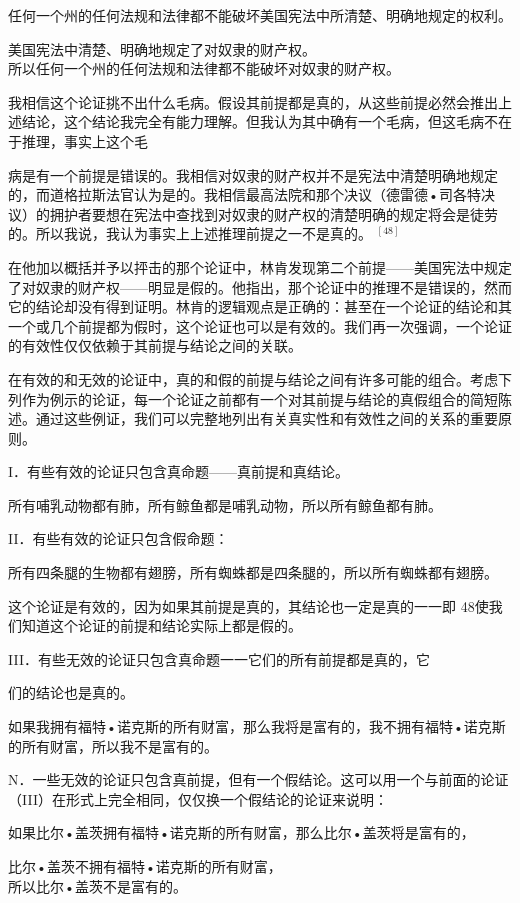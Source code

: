 任何一个州的任何法规和法律都不能破坏美国宪法中所清楚、明确地规定的权利。

美国宪法中清楚、明确地规定了对奴隶的财产权。\\
所以任何一个州的任何法规和法律都不能破坏对奴隶的财产权。

我相信这个论证挑不出什么毛病。假设其前提都是真的，从这些前提必然会推出上述结论，这个结论我完全有能力理解。但我认为其中确有一个毛病，但这毛病不在于推理，事实上这个毛

病是有一个前提是错误的。我相信对奴隶的财产权并不是宪法中清楚明确地规定的，而道格拉斯法官认为是的。我相信最高法院和那个决议（德雷德•司各特决议）的拥护者要想在宪法中查找到对奴隶的财产权的清楚明确的规定将会是徒劳的。所以我说，我认为事实上上述推理前提之一不是真的。 ${ }^{[48]}$

在他加以概括并予以抨击的那个论证中，林肯发现第二个前提——美国宪法中规定了对奴隶的财产权——明显是假的。他指出，那个论证中的推理不是错误的，然而它的结论却没有得到证明。林肯的逻辑观点是正确的：甚至在一个论证的结论和其一个或几个前提都为假时，这个论证也可以是有效的。我们再一次强调，一个论证的有效性仅仅依赖于其前提与结论之间的关联。

在有效的和无效的论证中，真的和假的前提与结论之间有许多可能的组合。考虑下列作为例示的论证，每一个论证之前都有一个对其前提与结论的真假组合的简短陈述。通过这些例证，我们可以完整地列出有关真实性和有效性之间的关系的重要原则。

I．有些有效的论证只包含真命题——真前提和真结论。

所有哺乳动物都有肺，所有鲸鱼都是哺乳动物，所以所有鲸鱼都有肺。

II．有些有效的论证只包含假命题：

所有四条腿的生物都有翅膀，所有蜘蛛都是四条腿的，所以所有蜘蛛都有翅膀。

这个论证是有效的，因为如果其前提是真的，其结论也一定是真的一一即 48使我们知道这个论证的前提和结论实际上都是假的。

III．有些无效的论证只包含真命题一一它们的所有前提都是真的，它

们的结论也是真的。

如果我拥有福特•诺克斯的所有财富，那么我将是富有的，我不拥有福特•诺克斯的所有财富，所以我不是富有的。

N．一些无效的论证只包含真前提，但有一个假结论。这可以用一个与前面的论证（III）在形式上完全相同，仅仅换一个假结论的论证来说明：

如果比尔•盖茨拥有福特•诺克斯的所有财富，那么比尔•盖茨将是富有的，

比尔•盖茨不拥有福特•诺克斯的所有财富，\\
所以比尔•盖茨不是富有的。

